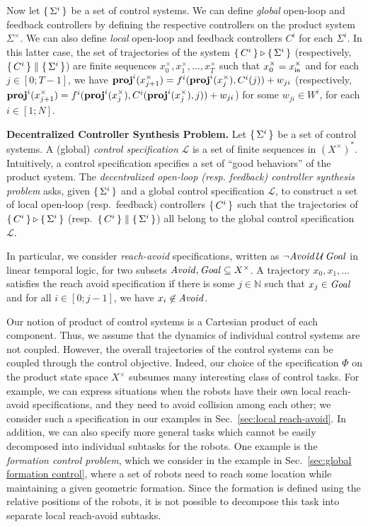 Now let $\set{\Sigma^i}$ be a set of control systems.
We can define \emph{global} open-loop and feedback controllers by defining the respective controllers on the product system $\Sigma^\times$.
We can also define \emph{local} open-loop and feedback controllers $C^i$ for each $\Sigma^i$.
In this latter case, the set of trajectories of the system $\set{C^i} \triangleright \set{\Sigma^i}$ (respectively, $\set{C^i}\parallel \set{\Sigma^i}$)
are finite sequences 
$x_0^\times, x_1^\times, \ldots, x_T^\times$ such that
$x_0^\times = x_{\mathsf{in}}^\times$ and for each $j \in [0;T-1]$, we have 
$\mathbf{proj}^{i}(x_{j+1}^\times) = f^i(\mathbf{proj}^i(x_j^\times), C^i(j))+w_{ji}$
(respectively, 
$\mathbf{proj}^{i}(x_{j+1}^\times) = f^i(\mathbf{proj}^i(x_j^\times), C^i(\mathbf{proj}^i(x_j^\times), j))+w_{ji}$)
for some $w_{ji} \in W^i$, for each $i\in [1;N]$.

\smallskip
\noindent
\textbf{Decentralized Controller Synthesis Problem.}
Let $\set{\Sigma^i}$ be a set of control systems.
A (global) \emph{control specification} $\mathcal{L}$ is a set of finite sequences in $(X^\times)^*$.
Intuitively, a control specification specifies a set of ``good behaviors'' of the product system.
The \emph{decentralized open-loop (resp. feedback) controller synthesis problem} asks, given $\set{\Sigma^i}$ and a global control specification $\mathcal{L}$,
to construct a set of local open-loop (resp.\ feedback) controllers $\set{C^i}$ such that
the trajectories of $\set{C^i}\triangleright \set{\Sigma^i}$ (resp.\ $\set{C^i}\parallel \set{\Sigma^i}$) all belong to the global
control specification $\mathcal{L}$.

In particular, we consider \emph{reach-avoid} specifications, written as  $\lnot\mathit{Avoid}\, \mathcal{U}\,\mathit{Goal}$ in linear temporal logic, for two subsets 
$\mathit{Avoid}, \mathit{Goal} \subseteq X^\times$.
A trajectory $x_0, x_1, \ldots$ satisfies the reach avoid specification if there is some $j\in \mathbb{N}$ such that $x_j \in\mathit{Goal}$ and
for all $i \in [0; j-1]$, we have $x_i \not \in\mathit{Avoid}$.

Our notion of product of control systems is a Cartesian product of each component. Thus, we assume that the dynamics of individual control
systems are not coupled.
However, the overall trajectories of the control systems can be coupled through the control objective.
Indeed, our choice of the specification $\Phi$ on the product state space $X^\times$ subsumes many interesting class of control tasks.
For example, we can express situations when the robots have their own local reach-avoid specifications, and they 
need to avoid collision among each other; we consider such a specification in our examples in Sec.~\ref{sec:local reach-avoid}.
In addition, we can also specify more general tasks which cannot be easily decomposed into individual subtasks for the robots.
One example is the \emph{formation control problem}, which we consider in the example in Sec.~\ref{sec:global formation control}, where a set of robots need to 
reach some location while maintaining a given geometric formation. 
Since the formation is defined using the relative positions of the robots, it is not possible to decompose this task into separate local reach-avoid subtasks.

